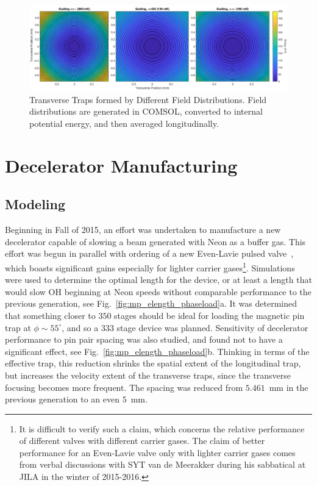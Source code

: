 \begin{figure}[t!]
\includegraphics[width=\linewidth]{Slowing/guiding_compilation.png}
\caption[Transverse Guiding Potentials]{\label{fig:guiding_compilation}
Transverse Traps formed by Different Field Distributions. Field distributions are generated in COMSOL, converted to internal potential energy, and then averaged longitudinally.}
\end{figure}



\section{Decelerator Manufacturing}

\subsection{Modeling}

Beginning in Fall of 2015, an effort was undertaken to manufacture a new decelerator capable of slowing a beam generated with Neon as a buffer gas. 
This effort was begun in parallel with ordering of a new Even-Lavie pulsed valve~\cite{Even2015}, which boasts significant gains especially for lighter carrier gases\footnote{It is difficult to verify such a claim, which concerns the relative performance of different valves with different carrier gases. The claim of better performance for an Even-Lavie valve only with lighter carrier gases comes from verbal discussions with SYT van de Meerakker during his sabbatical at JILA in the winter of 2015-2016.}.
Simulations were used to determine the optimal length for the device, or at least a length that would slow OH beginning at Neon speeds without comparable performance to the previous generation, see Fig.~\ref{fig:mp_elength_phaseload}a.
It was determined that something closer to $350$ stages should be ideal for loading the magnetic pin trap at $\phi\sim 55^\circ$, and so a $333$ stage device was planned.
Sensitivity of decelerator performance to pin pair spacing was also studied, and found not to have a significant effect, see Fig.~\ref{fig:mp_elength_phaseload}b.
Thinking in terms of the effective trap, this reduction shrinks the spatial extent of the longitudinal trap, but increases the velocity extent of the transverse traps, since the transverse focusing becomes more frequent.
The spacing was reduced from $5.461$~mm in the previous generation to an even $5$~mm.

